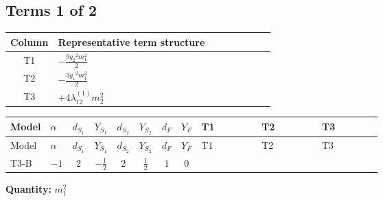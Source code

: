 \documentclass[8pt]{article}
\begin{document}
\begin{landscape}
\subsection*{Terms 1 of 2}
\begin{center}
\begin{tabular}{@{}c >{\raggedright\arraybackslash}p{0.82\linewidth}@{}}
\toprule
Column & Representative term structure \\
\midrule
T1 & \(\displaystyle -\frac{9 {g_2}^2 {m_1^2}}{2}\) \\
\midrule
T2 & \(\displaystyle -\frac{3 {g_1}^2 {m_1^2}}{2}\) \\
\midrule
T3 & \(\displaystyle +4 {\lambda_{12}^{(1)}} {m_2^2}\) \\
\midrule
\bottomrule
\end{tabular}
\end{center}
\smallskip
\tiny
\begin{longtable}{@{}llcccccc >{\raggedright\arraybackslash}p{0.21\linewidth} >{\raggedright\arraybackslash}p{0.21\linewidth} >{\raggedright\arraybackslash}p{0.21\linewidth}@{}}
\toprule
Model & $\alpha$ & $d_{S_1}$ & $Y_{S_1}$ & $d_{S_2}$ & $Y_{S_2}$ & $d_F$ & $Y_F$ & T1 & T2 & T3 \\
\midrule
\endfirsthead
\toprule
Model & $\alpha$ & $d_{S_1}$ & $Y_{S_1}$ & $d_{S_2}$ & $Y_{S_2}$ & $d_F$ & $Y_F$ & T1 & T2 & T3 \\
\midrule
\endhead
T3-B & $-1$ & $2$ & $-\frac{1}{2}$ & $2$ & $\frac{1}{2}$ & $1$ & $0$ & \scriptsize\adjustbox{max width=\linewidth}{$\begin{gathered} -\frac{9 {g_2}^2 {m_1^2}}{2}\end{gathered}$} & \scriptsize\adjustbox{max width=\linewidth}{$\begin{gathered} -\frac{3 {g_1}^2 {m_1^2}}{2}\end{gathered}$} & \scriptsize\adjustbox{max width=\linewidth}{$\begin{gathered} +4 {\lambda_{12}^{(1)}} {m_2^2}\end{gathered}$} \\
\midrule
\bottomrule
\end{longtable}
\clearpage
\noindent\textbf{Quantity: }$m_1^2$\par\smallskip

\end{landscape}
\end{document}
